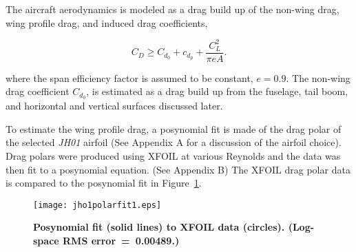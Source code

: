 The aircraft aerodynamics is modeled as a drag build up of the non-wing drag, wing profile drag, and induced drag coefficients, 

\begin{equation}
    \label{e:aerodragb}
    C_D \geq C_{d_0} + c_{d_p} + \frac{C_L^2}{\pi e A}.
    \end{equation}

where the span efficiency factor is assumed to be constant, $e=0.9$. 
The non-wing drag coefficient $C_{d_0}$, is estimated as a drag build up from the fuselage, tail boom, and horizontal and vertical surfaces discussed later.
    
    To estimate the wing profile drag, a posynomial fit is made of the drag polar of the selected \emph{JH01} airfoil (See Appendix A for a discussion of the airfoil choice). 
    Drag polars were produced using XFOIL\cite{xfoil} at various Reynolds and the data was then fit to a posynomial equation. (See Appendix B)
    The XFOIL drag polar data is compared to the posynomial fit in Figure~\ref{f:JH01polar}.


\begin{figure}[h!]
	\begin{center}
	\texttt{[image: jho1polarfit1.eps]}
    \caption{\textbf{Posynomial fit (solid lines) to XFOIL data (circles).  (Log-space RMS error~=~0.00489.)}}
	\label{f:JH01polar}
	\end{center}
\end{figure}

